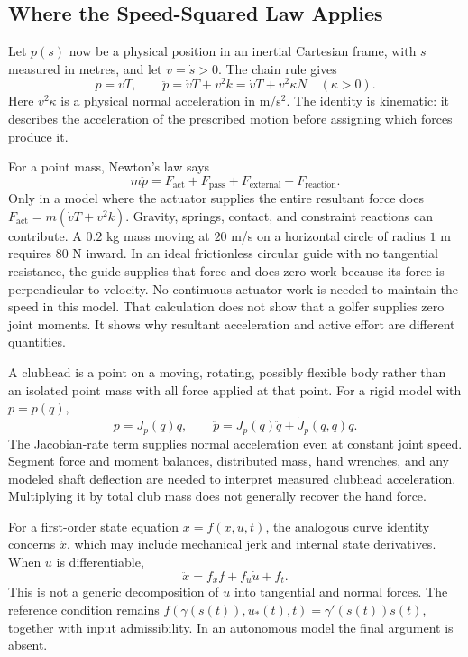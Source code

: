 \documentclass[12pt, openany]{book}
\theoremstyle{plain}
\begin{document}
\subsection{Where the Speed-Squared Law Applies}

Let $p(s)$ now be a physical position in an inertial Cartesian frame, with
$s$ measured in metres, and let $v=\dot s>0$. The chain rule gives
\begin{equation}\label{eq:centripetal}
 \dot p=vT,\qquad \ddot p=\dot vT+v^2k
 =\dot vT+v^2\kappa N\quad(\kappa>0).
\end{equation}
Here $v^2\kappa$ is a physical normal acceleration in m/s$^2$. The identity
is kinematic: it describes the acceleration of the prescribed motion before
assigning which forces produce it.

For a point mass, Newton's law says
\begin{equation}\label{eq:control_demand}
 m\ddot p=F_{\mathrm{act}}+F_{\mathrm{pass}}+F_{\mathrm{external}}
 +F_{\mathrm{reaction}}.
\end{equation}
Only in a model where the actuator supplies the entire resultant force does
$F_{\mathrm{act}}=m(\dot vT+v^2k)$. Gravity, springs, contact, and constraint
reactions can contribute. A $0.2$ kg mass moving at $20$ m/s on a horizontal
circle of radius $1$ m requires $80$ N inward. In an ideal frictionless
circular guide with no tangential resistance, the guide supplies that force
and does zero work because its force is perpendicular to velocity. No
continuous actuator work is needed to maintain the speed in this model.
That calculation does not show that a golfer supplies zero joint moments.
It shows why resultant acceleration and active effort are different
quantities.

A clubhead is a point on a moving, rotating, possibly flexible body rather
than an isolated point mass with all force applied at that point. For a
rigid model with $p=p(q)$,
\begin{equation}
 \dot p=J_p(q)\dot q,\qquad
 \ddot p=J_p(q)\ddot q+\dot J_p(q,\dot q)\dot q.
\end{equation}
The Jacobian-rate term supplies normal acceleration even at constant joint
speed. Segment force and moment balances, distributed mass, hand wrenches,
and any modeled shaft deflection are needed to interpret measured clubhead
acceleration. Multiplying it by total club mass does not generally recover
the hand force.

For a first-order state equation $\dot x=f(x,u,t)$, the analogous curve
identity concerns $\ddot x$, which may include mechanical jerk and internal
state derivatives. When $u$ is differentiable,
\begin{equation}
 \ddot x=f_xf+f_u\dot u+f_t.
\end{equation}
This is not a generic decomposition of $u$ into tangential and normal
forces. The reference condition remains
$f(\gamma(s(t)),u_*(t),t)=\gamma'(s(t))\dot s(t)$, together with input
admissibility. In an autonomous model the final argument is absent.
\end{document}

